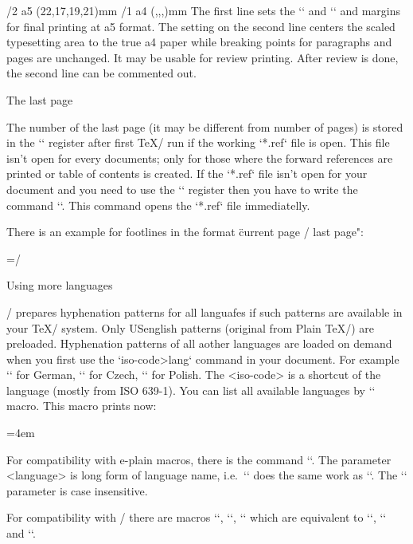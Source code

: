 {\begtt
\margins/2 a5 (22,17,19,21)mm
\magscale[1414] \margins/1 a4 (,,,)mm
\endtt
%
The first line sets the `\hsize` and `\vsize` and margins for final
printing at a5 format. The setting on the second line centers the scaled 
typesetting area to the true a4 paper while breaking points for paragraphs
and pages are unchanged. It may be usable for 
review printing. After review is done, the second line can be commented out.


\sec The last page

The number of the last page (it may be different from number of pages) is
stored in the `\lastpage` register after first \TeX/ run if the working `*.ref` 
file is open. This file isn't open for every documents; only for those
where the forward references are printed or table of contents is created.
If the `*.ref` file isn't open for your document and you need to use the
`\lastpage` register then you have to write the command `\openref`. This command opens
the `*.ref` file immediatelly.

There is an example for footlines in the format \"current page / last page": 

\begtt
\footline={\hss \rm \thefontsize[10]\the\pageno/\the\lastpage \hss}
\endtt


\sec Using more languages

\OpTeX/ prepares hyphenation patterns for all languafes if such patterns are
available in your \TeX/ system. 
\new
Only USenglish patterns (original from Plain \TeX/) are preloaded.
Hyphenation patterns of all aother languages are loaded on demand when you first use
the `\<iso-code>lang` command in your document. 
For example `\delang` for German, `\cslang` for
Czech, `\pllang` for Polish. The <iso-code> is a shortcut 
of the language (mostly from ISO 639-1). 
You can list all available languages by `\langlist` 
macro. This macro prints now:

\medskip
{\typosize[9/11.5]\emergencystretch=4em 
\noindent \langlist
\par}
\medskip

\new
For compatibility with e-plain macros, there is the command
``. The parameter <language> is long form of
language name, i.e.\ `` does the same work as `\cslang`.
The `\uselanguage` parameter is case insensitive.

For compatibility with \csplain/ there are macros `\ehyph`, `\chyph`,
`\shyph` which are equivalent to `\enlang`, `\cslang` and `\sklang`.

}
